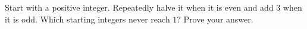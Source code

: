 Start with a positive integer. Repeatedly halve it when it is even and add $3$ when it is odd. Which starting integers never reach $1$? Prove your answer.
